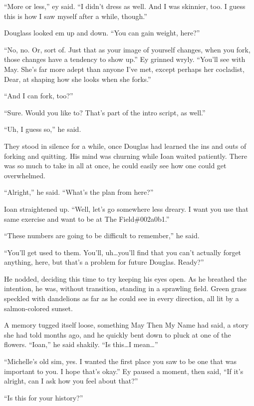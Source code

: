 ``More or less,'' ey said. ``I didn't dress as well. And I was skinnier, too. I guess this is how I saw myself after a while, though.''

Douglass looked em up and down. ``You can gain weight, here?''

``No, no. Or, sort of. Just that as your image of yourself changes, when you fork, those changes have a tendency to show up.'' Ey grinned wryly. ``You'll see with May. She's far more adept than anyone I've met, except perhaps her cocladist, Dear, at shaping how she looks when she forks.''

``And I can fork, too?''

``Sure. Would you like to? That's part of the intro script, as well.''

``Uh, I guess so,'' he said.

They stood in silence for a while, once Douglas had learned the ins and outs of forking and quitting. His mind was churning while Ioan waited patiently. There was so much to take in all at once, he could easily see how one could get overwhelmed.

``Alright,'' he said. ``What's the plan from here?''

Ioan straightened up. ``Well, let's go somewhere less dreary. I want you use that same exercise and want to be at The Field\#002a0b1.''

``These numbers are going to be difficult to remember,'' he said.

``You'll get used to them. You'll, uh\ldots you'll find that you can't actually forget anything, here, but that's a problem for future Douglas. Ready?''

He nodded, deciding this time to try keeping his eyes open. As he breathed the intention, he was, without transition, standing in a sprawling field. Green grass speckled with dandelions as far as he could see in every direction, all lit by a salmon-colored sunset.

A memory tugged itself loose, something May Then My Name had said, a story she had told months ago, and he quickly bent down to pluck at one of the flowers. ``Ioan,'' he said shakily. ``Is this\ldots I mean\ldots{}''

``Michelle's old sim, yes. I wanted the first place you saw to be one that was important to you. I hope that's okay.'' Ey paused a moment, then said, ``If it's alright, can I ask how you feel about that?''

``Is this for your history?''

